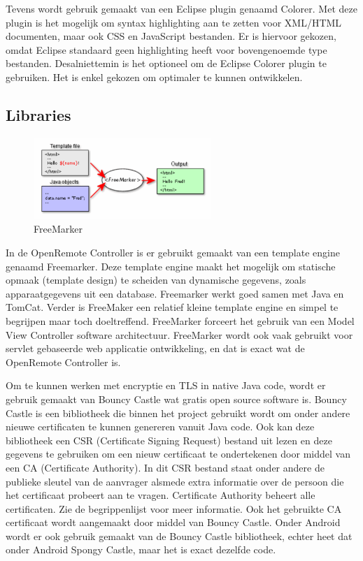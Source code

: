 \documentclass[]{article}
\begin{document}
Tevens wordt gebruik gemaakt van een Eclipse plugin genaamd Colorer.
Met deze plugin is het mogelijk om syntax highlighting aan te zetten voor
XML/HTML documenten, maar ook CSS en JavaScript bestanden. Er is hiervoor
gekozen, omdat Eclipse standaard geen highlighting heeft voor bovengenoemde
type bestanden. Desalniettemin is het optioneel om de Eclipse Colorer
plugin te gebruiken. Het is enkel gekozen om optimaler te kunnen ontwikkelen.

\subsection{Libraries}
\begin{figure}[htpb]
   \begin{center}
     \includegraphics[width=0.6\textwidth]{freemarker.pdf}
   \end{center}
   \caption{FreeMarker}
\end{figure}

In de OpenRemote Controller is er gebruikt gemaakt van een template engine
genaamd Freemarker. Deze template engine maakt het mogelijk om statische
opmaak (template design) te scheiden van dynamische gegevens, zoals apparaatgegevens
uit een database. Freemarker werkt goed samen met Java en TomCat.
Verder is FreeMaker een relatief kleine template engine en simpel te
begrijpen maar toch doeltreffend. FreeMarker forceert het gebruik
van een Model View Controller software architectuur. FreeMarker wordt ook
vaak gebruikt voor servlet gebaseerde web applicatie ontwikkeling, en dat is
exact wat de OpenRemote Controller is.

Om te kunnen werken met encryptie en TLS in native Java code, wordt er gebruik
gemaakt van Bouncy Castle wat gratis open source software is.  Bouncy Castle is
een bibliotheek die binnen het project gebruikt wordt om onder andere nieuwe
certificaten te kunnen genereren vanuit Java code. Ook kan deze bibliotheek een
CSR (Certificate Signing Request) bestand uit lezen en deze gegevens te
gebruiken om een nieuw certificaat te ondertekenen door middel van een CA
(Certificate Authority). In dit CSR bestand staat onder andere de publieke
sleutel van de aanvrager alsmede extra informatie over de persoon die het
certificaat probeert aan te vragen.  Certificate Authority beheert alle
certificaten. Zie de begrippenlijst voor meer informatie. Ook het gebruikte CA
certificaat wordt aangemaakt door middel van Bouncy Castle. Onder Android wordt
er ook gebruik gemaakt van de Bouncy Castle bibliotheek, echter heet dat onder
Android Spongy Castle, maar het is exact dezelfde code.
\end{document}
